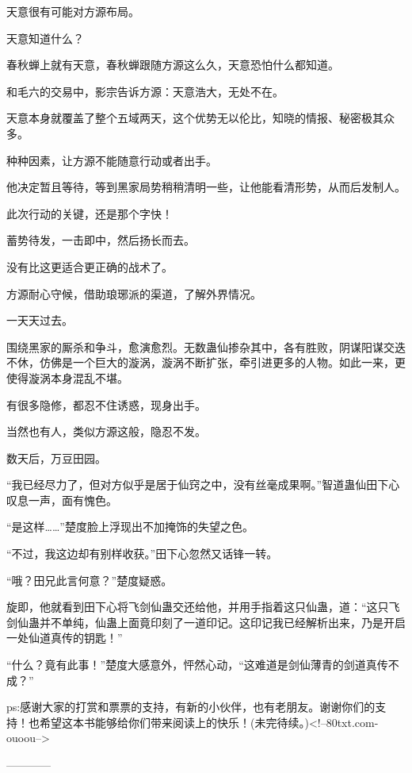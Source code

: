 \begin{this_body}
天意很有可能对方源布局。

天意知道什么？

春秋蝉上就有天意，春秋蝉跟随方源这么久，天意恐怕什么都知道。

和毛六的交易中，影宗告诉方源：天意浩大，无处不在。

天意本身就覆盖了整个五域两天，这个优势无以伦比，知晓的情报、秘密极其众多。

种种因素，让方源不能随意行动或者出手。

他决定暂且等待，等到黑家局势稍稍清明一些，让他能看清形势，从而后发制人。

此次行动的关键，还是那个字快！

蓄势待发，一击即中，然后扬长而去。

没有比这更适合更正确的战术了。

方源耐心守候，借助琅琊派的渠道，了解外界情况。

一天天过去。

围绕黑家的厮杀和争斗，愈演愈烈。无数蛊仙掺杂其中，各有胜败，阴谋阳谋交迭不休，仿佛是一个巨大的漩涡，漩涡不断扩张，牵引进更多的人物。如此一来，更使得漩涡本身混乱不堪。

有很多隐修，都忍不住诱惑，现身出手。

当然也有人，类似方源这般，隐忍不发。

数天后，万豆田园。

“我已经尽力了，但对方似乎是居于仙窍之中，没有丝毫成果啊。”智道蛊仙田下心叹息一声，面有愧色。

“是这样……”楚度脸上浮现出不加掩饰的失望之色。

“不过，我这边却有别样收获。”田下心忽然又话锋一转。

“哦？田兄此言何意？”楚度疑惑。

旋即，他就看到田下心将飞剑仙蛊交还给他，并用手指着这只仙蛊，道：“这只飞剑仙蛊并不单纯，仙蛊上面竟印刻了一道印记。这印记我已经解析出来，乃是开启一处仙道真传的钥匙！”

“什么？竟有此事！”楚度大感意外，怦然心动，“这难道是剑仙薄青的剑道真传不成？”

ps:感谢大家的打赏和票票的支持，有新的小伙伴，也有老朋友。谢谢你们的支持！也希望这本书能够给你们带来阅读上的快乐！(未完待续。)<!--80txt.com-ouoou-->

------------

\end{this_body}

